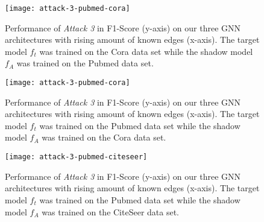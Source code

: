   \begin{figure}[h]
      \begin{center}
          \texttt{[image: attack-3-pubmed-cora]}
          \caption[Attack 3 - $D_{f_t} = Cora$ and $D_A = Pubmed$]{Performance of \emph{Attack 3} in F1-Score (y-axis) on our three GNN architectures with rising amount of known edges (x-axis). The target model $f_t$ was trained on the Cora data set while the shadow model $f_A$ was trained on the Pubmed data set.}
          \label{figure:eval-att3-pubmed-cora}
      \end{center}
  \end{figure}

  \begin{figure}[h]
    \begin{center}
        \texttt{[image: attack-3-pubmed-cora]}
        \caption[Attack 3 - $D_{f_t} = Pubmed$ and $D_A = Cora$]{Performance of \emph{Attack 3} in F1-Score (y-axis) on our three GNN architectures with rising amount of known edges (x-axis). The target model $f_t$ was trained on the Pubmed data set while the shadow model $f_A$ was trained on the Cora data set.}
        \label{figure:eval-att3-cora-pubmed}
    \end{center}
  \end{figure}

  \begin{figure}[h]
      \begin{center}
          \texttt{[image: attack-3-pubmed-citeseer]}
          \caption[Attack 3 - $D_{f_t} = Pubmed$ and $D_A = CiteSeer$]{Performance of \emph{Attack 3} in F1-Score (y-axis) on our three GNN architectures with rising amount of known edges (x-axis). The target model $f_t$ was trained on the Pubmed data set while the shadow model $f_A$ was trained on the CiteSeer data set.}
          \label{figure:eval-att3-citeseer-pubmed}
      \end{center}
  \end{figure}